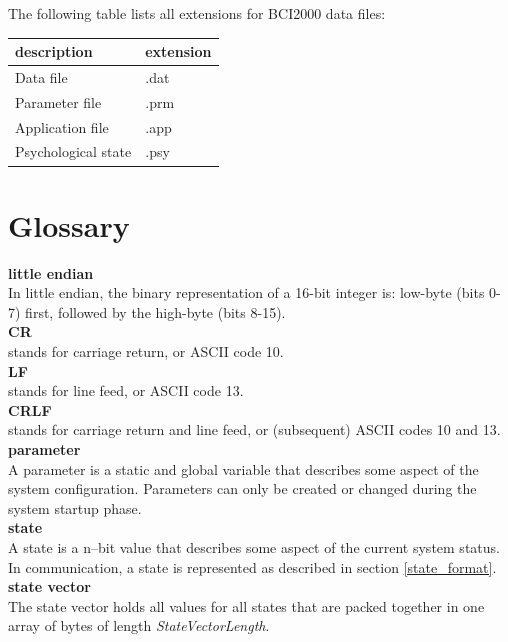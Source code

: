 \documentclass[letterpaper,oneside,12pt]{book}
\begin{document}
The following table lists all extensions for BCI2000 data files:
\vspace{0.5cm}\\
\begin{centering}
 \centering
 \begin{tabular}{|l|l|}
  \hline
  \textbf{description} & \textbf{extension} \\
  \hline
  Data file & .dat \\
  \hline
  Parameter file & .prm \\
  \hline
  Application file & .app \\
  \hline
  Psychological state & .psy \\
  \hline
 \end{tabular}
\end{centering}   

\section{Glossary} 

\textbf{little endian} \\
In little endian, the binary representation of a 16-bit integer is: low-byte (bits 0-7)
first, followed by the high-byte (bits 8-15).
\\[2ex]
\textbf{CR} \\
stands for carriage return, or {ASCII} code 10.
\\[2ex]
\textbf{LF} \\
stands for line feed, or {ASCII} code 13.
\\[2ex]
\textbf{CRLF} \\
stands for carriage return and line feed, or (subsequent) {ASCII} codes 10 and 13.
\\[2ex]
\textbf{parameter} \\
A parameter is a static and global variable that describes some aspect of the 
system configuration. Parameters can only be created or changed during the 
system startup phase.
\\[2ex]
\textbf{state} \\
A state is a n--bit value that describes some aspect of the current system 
status. In communication, a state is represented as described in section
\ref{state_format}.
\\[2ex]
\textbf{state vector} \\
The state vector holds all values for all states that are packed together in one
array of bytes of length \textit{StateVectorLength}.


\backmatter
\end{document}
